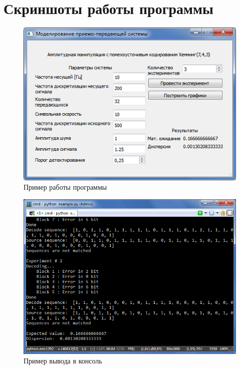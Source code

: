 \documentclass[utf8,usehyperref,12pt]{G7-32}
\begin{document}
\chapter{Скриншоты работы программы}

\begin{figure}[H]
\begin{center}
\includegraphics[scale=1]{Image/1.png}
\caption{Пример работы программы}
\end{center}
\end{figure}

\begin{figure}[H]
\begin{center}
\includegraphics[scale=0.8]{Image/2.png}
\caption{Пример вывода в консоль}
\end{center}
\end{figure}
\end{document}
